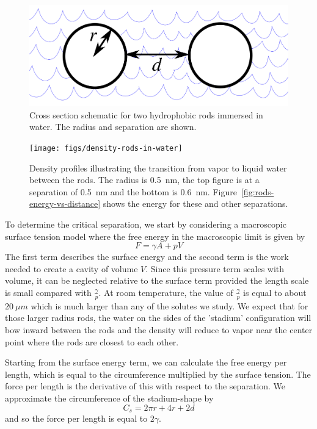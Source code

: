 \documentclass[letterpaper,twocolumn,amsmath,amssymb,prb]{revtex4-1}
\begin{document}
\begin{figure}
\begin{center}
\includegraphics[width=\columnwidth]{figs/rods-diagram}
\end{center}
\caption{ Cross section schematic for two hydrophobic rods immersed in water.
The radius and separation are shown.}
\label{fig:rods}
\end{figure}

\begin{figure}
\begin{center}
\texttt{[image: figs/density-rods-in-water]}
\end{center}
\caption{ Density profiles illustrating the transition from vapor 
to liquid water between the rods. The radius is 0.5~nm, the top figure is 
at a separation of 0.5~nm and the
bottom is 0.6~nm. Figure~\ref{fig:rods-energy-vs-distance} shows
the energy for these and other separations.}
\label{fig:density-rods}
\end{figure}

To determine the critical separation, we start by considering a macroscopic surface
tension model where the free energy in the macroscopic limit is given by 
\begin{equation}
F = \gamma A + pV
\end{equation}
The first term describes the surface energy and the second term
is the work needed to create a cavity of volume $V$. Since this pressure term
scales with volume, it can be neglected relative to the surface term provided
the length scale is small compared with $\frac{\gamma} p$. At room temperature,
the value of $\frac{\gamma} p$ is equal to about $20~\mu m$ which is
much larger than any of the solutes we study. We expect that for those
larger radius 
rods, the water on the sides of the 'stadium' configuration will bow inward 
between the rods and the density will reduce to vapor near the center
point where the rods are closest to each other.

Starting from the surface energy term, we can calculate the 
free energy per length, which is equal to the circumference multiplied 
by the surface tension. The force per length is the derivative of this
with respect to the separation. 
We approximate the circumference of the stadium-shape by
\begin{equation}
C_{s} = 2\pi r +4r+2d
\end{equation}
and so the force per length is equal to $2\gamma$.
\end{document}
